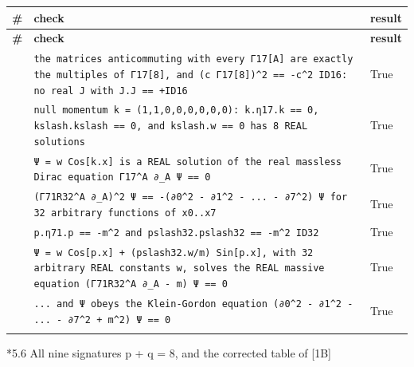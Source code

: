 \documentclass[10pt,a4paper]{article}
\makeatletter
\renewcommand\subsubsection{\@startsection{subsubsection}{3}{\z@}{-3.25ex\@plus -1ex \@minus -.2ex}{1.5ex \@plus .2ex}{\normalfont\normalsize\bfseries\raggedright}}
\makeatother
\begin{document}
{\footnotesize
\begin{longtable}{>{\raggedright\arraybackslash}p{}>{\raggedright\arraybackslash}p{}>{\raggedright\arraybackslash}p{}}
\toprule
\textbf{\#} & \textbf{check} & \textbf{result} \\
\midrule\endfirsthead
\toprule
\textbf{\#} & \textbf{check} & \textbf{result} \\
\midrule\endhead
\endfoot
\bottomrule\endlastfoot
117 & \texttt{the matrices anticommuting with every Γ17[A] are exactly the multiples of Γ17[8], and (c Γ17[8])\textasciicircum{}2 == -c\textasciicircum{}2 ID16: no real J with J.J == +ID16} & True \\
118 & \texttt{null momentum k = (1,1,0,0,0,0,0,0): k.η17.k == 0, kslash.kslash == 0, and kslash.w == 0 has 8 REAL solutions} & True \\
119 & \texttt{Ψ = w Cos[k.x] is a REAL solution of the real massless Dirac equation Γ17\textasciicircum{}A ∂\_\allowbreak{}A Ψ == 0} & True \\
120 & \texttt{(Γ71R32\textasciicircum{}A ∂\_\allowbreak{}A)\textasciicircum{}2 Ψ == -(∂0\textasciicircum{}2 - ∂1\textasciicircum{}2 - ... - ∂7\textasciicircum{}2) Ψ for 32 arbitrary functions of x0..x7} & True \\
121 & \texttt{p.η71.p == -m\textasciicircum{}2 and pslash32.pslash32 == -m\textasciicircum{}2 ID32} & True \\
122 & \texttt{Ψ = w Cos[p.x] + (pslash32.w/\allowbreak{}m) Sin[p.x], with 32 arbitrary REAL constants w, solves the REAL massive equation (Γ71R32\textasciicircum{}A ∂\_\allowbreak{}A - m) Ψ == 0} & True \\
123 & \texttt{... and Ψ obeys the Klein-Gordon equation (∂0\textasciicircum{}2 - ∂1\textasciicircum{}2 - ... - ∂7\textasciicircum{}2 + m\textasciicircum{}2) Ψ == 0} & True \\*
\end{longtable}}
\subsubsection*{5.6 All nine signatures p + q = 8, and the corrected table of [1B]}
\end{document}

